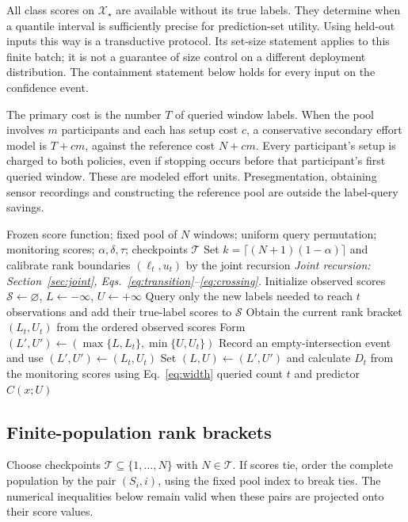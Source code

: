 \documentclass[pdflatex,sn-basic,Numbered,iicol]{sn-jnl}
\begin{document}
All class scores on $\mathcal X_\star$ are available without its true labels. They determine when a quantile interval is sufficiently precise for prediction-set utility. Using held-out inputs this way is a transductive protocol. Its set-size statement applies to this finite batch; it is not a guarantee of size control on a different deployment distribution. The containment statement below holds for every input on the confidence event.

The primary cost is the number $T$ of queried window labels. When the pool involves $m$ participants and each has setup cost $c$, a conservative secondary effort model is $T+cm$, against the reference cost $N+cm$. Every participant's setup is charged to both policies, even if stopping occurs before that participant's first queried window. These are modeled effort units. Presegmentation, obtaining sensor recordings and constructing the reference pool are outside the label-query savings.


\begin{algorithm*}[t]
\caption{Joint rank calibration for a fixed reference pool}\label{alg:jrc}
\begin{algorithmic}[1]
\Require Frozen score function; fixed pool of $N$ windows; uniform query permutation; monitoring scores; $\alpha,\delta,\tau$; checkpoints $\mathcal T$
\State Set $k=\lceil(N+1)(1-\alpha)\rceil$ and calibrate rank boundaries $(\ell_t,u_t)$ by the joint recursion
\Statex \hspace{\algorithmicindent}\textit{Joint recursion: Section~\ref{sec:joint}, Eqs.~\eqref{eq:transition}--\eqref{eq:crossing}.}
\State Initialize observed scores $\mathcal S\gets\varnothing$, $L\gets-\infty$, $U\gets+\infty$
\State Query only the new labels needed to reach $t$ observations and add their true-label scores to $\mathcal S$
\State Obtain the current rank bracket $(L_t,U_t)$ from the ordered observed scores
\State Form $(L',U')\gets(\max\{L,L_t\},\min\{U,U_t\})$
\State Record an empty-intersection event and use $(L',U')\gets(L_t,U_t)$
\EndIf
\State Set $(L,U)\gets(L',U')$ and calculate $D_t$ from the monitoring scores using Eq.~\eqref{eq:width}
\State \Return queried count $t$ and predictor $C(x;U)$
\EndIf
\EndFor
\end{algorithmic}
\end{algorithm*}

\subsection{Finite-population rank brackets}
Choose checkpoints $\mathcal T\subseteq\{1,\ldots,N\}$ with $N\in\mathcal T$. If scores tie, order the complete population by the pair $(S_i,i)$, using the fixed pool index to break ties. The numerical inequalities below remain valid when these pairs are projected onto their score values.
\end{document}
